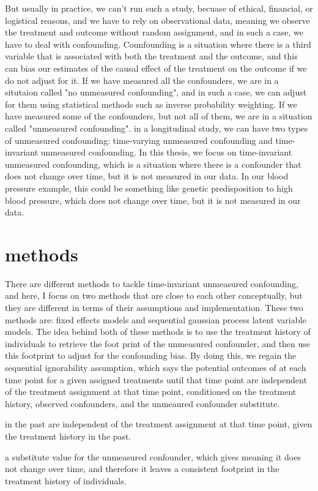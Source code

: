 But usually in practice, we can't run such a study, becuase of ethical, financial, or logistical reasons,
and we have to rely on observational data, meaning we observe the treatment and outcome without random assignment,
and in such a case, we have to deal with confounding. Counfounding is a situation where there is a third variable 
that is associated with both the treatment and the outcome, and this can bias our estimates of the causal effect of the treatment on the outcome if 
we do not adjust for it. If we have measured all the confounders, we are in a situtaion called "no unmeasured confounding", 
and in such a case, we can adjust for them using statistical methods such as inverse probability weighting.
If we have measured some of the confounders, but not all of them, we are in a situation called "unmeasured confounding". 
in a longitudinal study, we can have two types of unmeasured confounding: time-varying unmeasured confounding and time-invariant unmeasured confounding.
In this thesis, we focus on time-invariant unmeasured confounding, which is a situation where there is a 
confounder that does not change over time, but it is not measured in our data. In our blood pressure example, this could be something like 
genetic predisposition to high blood pressure, which does not change over time, but it is not measured in our data.

\section{methods}
There are different methods to tackle time-invariant unmeasured confounding, and here, I focus on two methods that are 
close to each other conceptually, but they are different in terms of their assumptions and implementation. These two methods are: 
fixed effects models and sequential gaussian process latent variable models. The idea behind both of these methods is 
to use the treatment history of individuals to retrieve the foot print of the unmeasured confounder, 
and then use this footprint to adjust for the confounding bias. By doing this, we regain the sequential ignorability assumption, 
which says the potential outcomes of at each time point for a given assigned treatments until that time point 
are independent of the treatment assignment at that time point, conditioned on the treatment history, observed confounders, 
and the unmeaured confounder substitute. 


in the past are independent of the treatment assignment at that time point, given the treatment history in the past.



a substitute value for the unmeasured confounder, which gives 
 meaning it does not change over time, and therefore it leaves a consistent footprint in the treatment history of individuals.








